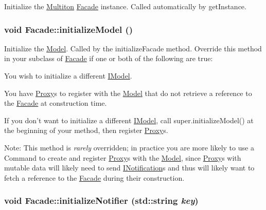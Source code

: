 Initialize the \hyperlink{class_pure_m_v_c_1_1_multiton}{Multiton} {\ttfamily \hyperlink{class_pure_m_v_c_1_1_facade}{Facade}} instance. Called automatically by getInstance. \hypertarget{class_pure_m_v_c_1_1_facade_aa9d0e1781ad74fd5fb7fd19f473514fb}{
\subsubsection[{initializeModel}]{\setlength{\rightskip}{0pt plus 5cm}void Facade::initializeModel ()}}
\label{class_pure_m_v_c_1_1_facade_aa9d0e1781ad74fd5fb7fd19f473514fb}


Initialize the {\ttfamily \hyperlink{class_pure_m_v_c_1_1_model}{Model}}. Called by the {\ttfamily initializeFacade} method. Override this method in your subclass of {\ttfamily \hyperlink{class_pure_m_v_c_1_1_facade}{Facade}} if one or both of the following are true: 
\begin{DoxyItemize}
\item You wish to initialize a different {\ttfamily \hyperlink{class_pure_m_v_c_1_1_i_model}{IModel}}. 
\item You have {\ttfamily \hyperlink{class_pure_m_v_c_1_1_proxy}{Proxy}}s to register with the \hyperlink{class_pure_m_v_c_1_1_model}{Model} that do not retrieve a reference to the \hyperlink{class_pure_m_v_c_1_1_facade}{Facade} at construction time. 
\end{DoxyItemize}If you don't want to initialize a different {\ttfamily \hyperlink{class_pure_m_v_c_1_1_i_model}{IModel}}, call {\ttfamily super.initializeModel()} at the beginning of your method, then register {\ttfamily \hyperlink{class_pure_m_v_c_1_1_proxy}{Proxy}}s. 

Note: This method is {\itshape rarely\/} overridden; in practice you are more likely to use a {\ttfamily Command} to create and register {\ttfamily \hyperlink{class_pure_m_v_c_1_1_proxy}{Proxy}}s with the {\ttfamily \hyperlink{class_pure_m_v_c_1_1_model}{Model}}, since {\ttfamily \hyperlink{class_pure_m_v_c_1_1_proxy}{Proxy}}s with mutable data will likely need to send {\ttfamily \hyperlink{class_pure_m_v_c_1_1_i_notification}{INotification}}s and thus will likely want to fetch a reference to the {\ttfamily \hyperlink{class_pure_m_v_c_1_1_facade}{Facade}} during their construction.  \hypertarget{class_pure_m_v_c_1_1_facade_a94c72ff29f9f42ff084f247b180fb4ad}{
\subsubsection[{initializeNotifier}]{\setlength{\rightskip}{0pt plus 5cm}void Facade::initializeNotifier (std::string {\em key})}}
\label{class_pure_m_v_c_1_1_facade_a94c72ff29f9f42ff084f247b180fb4ad}


